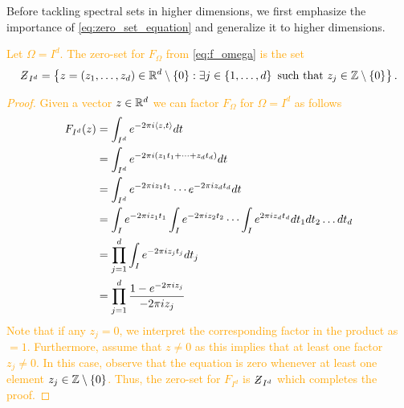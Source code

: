 \documentclass[../thesis.tex]{subfiles}
\begin{document}
Before tackling spectral sets in higher dimensions, we first emphasize the importance of \cref{eq:zero_set_equation} and generalize it to higher dimensions. 
\textcolor{orange}{  %
\begin{lemma}\label{lem:zero_set_jp_1_5}
    Let $\Omega = I^d$. The zero-set for $F_{\Omega}$ from \cref{eq:f_omega} %
    is the set
    \begin{equation*}
        \Zstroke_{I^d} = \braqMed{ z = \brac{z_1,\dots,z_d}\in \R^d \setminus \braqMed{0} : \exists \space j \in \braqMed{1,\dots, d} \text{ such that } z_j \in  \intnozero}.
    \end{equation*}
\end{lemma}
} %
\textcolor{orange}{  %
\begin{proof} %
    Given a vector $z \in \mathbb{R}^d$ we can factor $F_{\Omega}$ for $\Omega = I^d$ as follows
    \begin{align*}
        F_{I^d} (z) &= \int_{I^d} e^{-2 \pi i \braa{z,t}} dt\\
        &= \int_{I^d} e^{-2\pi i  (z_1 t_1 + \dots +z_d t_d)} dt\\
        &= \int_{I^d} e^{-2\pi i z_1 t_1}  \cdots e^{-2\pi i z_d t_d}  dt\\
        &= \int_{I} e^{-2\pi i z_1 t_1} \int_{I} e^{-2\pi i z_2 t_2}  \cdots \int_{I} e^{2\pi i z_d t_d}  dt_1 dt_2\dots dt_d\\ %
        &= \prod_{j=1}^d \int_I e^{-2\pi i z_j t_j} dt_j\\
        &= \prod_{j=1}^d \frac{1-e^{-2 \pi i z_j}}{-2 \pi i z_j} %
    \end{align*}
    Note that if any $z_j = 0$, we interpret the corresponding factor in the product as $=1$. Furthermore, assume that $z\neq 0$ as this implies that at least one factor $z_j\neq 0$. In this case, observe that the equation is zero whenever at least one element $z_j\in \mathbb{Z}\setminus\{0\}$. %
    Thus, the zero-set for $F_{I^d}$ is $\Zstroke_{I^d}$ which completes the proof. %
\end{proof}
} %
\end{document}
